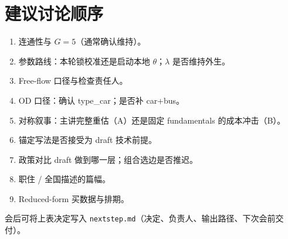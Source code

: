 \documentclass[11pt,a4paper]{article}
\begin{document}
\section{建议讨论顺序}

\begin{enumerate}[leftmargin=*]
  \item 连通性与 $G=5$（通常确认维持）。
  \item 参数路线：本轮锁校准还是启动本地 $\theta$；$\lambda$ 是否维持外生。
  \item Free-flow 口径与检查责任人。
  \item OD 口径：确认 type\_car；是否补 car+bus。
  \item 对称叙事：主讲完整重估（A）还是固定 fundamentals 的成本冲击（B）。
  \item 锚定写法是否接受为 draft 技术前提。
  \item 政策对比 draft 做到哪一层；组合选边是否推迟。
  \item 职住 / 全国描述的篇幅。
  \item Reduced-form 买数据与排期。
\end{enumerate}

\vspace{1em}
\noindent
会后可将上表决定写入 \texttt{nextstep.md}（决定、负责人、输出路径、下次会前交付）。
\end{document}
